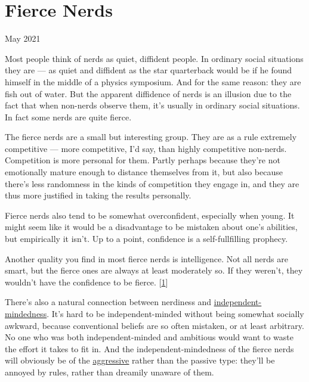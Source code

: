 \chapter{Fierce Nerds}


            
              
                

May 2021

Most people think of nerds as quiet,
                  diffident people. In ordinary social situations they are
                  --- as quiet and diffident as the star quarterback would
                  be if he found himself in the middle of a physics symposium.
                  And for the same reason: they are fish out of water. But the
                  apparent diffidence of nerds is an illusion due to the fact
                  that when non-nerds observe them, it's usually in ordinary
                  social situations. In fact some nerds are quite fierce.

The
                  fierce nerds are a small but interesting group. They are as a
                  rule extremely competitive --- more competitive, I'd say,
                  than highly competitive non-nerds. Competition is more
                  personal for them. Partly perhaps because they're not
                  emotionally mature enough to distance themselves from it, but
                  also because there's less randomness in the kinds of
                  competition they engage in, and they are thus more justified
                  in taking the results personally.

Fierce nerds also
                  tend to be somewhat overconfident, especially when young. It
                  might seem like it would be a disadvantage to be mistaken
                  about one's abilities, but empirically it isn't. Up to a
                  point, confidence is a self-fullfilling prophecy.

Another
                  quality you find in most fierce nerds is intelligence. Not all
                  nerds are smart, but the fierce ones are always at least
                  moderately so. If they weren't, they wouldn't have the
                  confidence to be fierce.
                  [\href{\#f1n}{1}]

There's also a natural connection between
                  nerdiness and
                  \href{http://www.paulgraham.com/think.html}{\underline{independent-mindedness}}. It's hard to be independent-minded without being somewhat
                  socially awkward, because conventional beliefs are so often
                  mistaken, or at least arbitrary. No one who was both
                  independent-minded and ambitious would want to waste the
                  effort it takes to fit in. And the independent-mindedness of
                  the fierce nerds will obviously be of the
                  \href{http://www.paulgraham.com/conformism.html}{\underline{aggressive}} rather than
                  the passive type: they'll be annoyed by rules, rather than
                  dreamily unaware of them.

